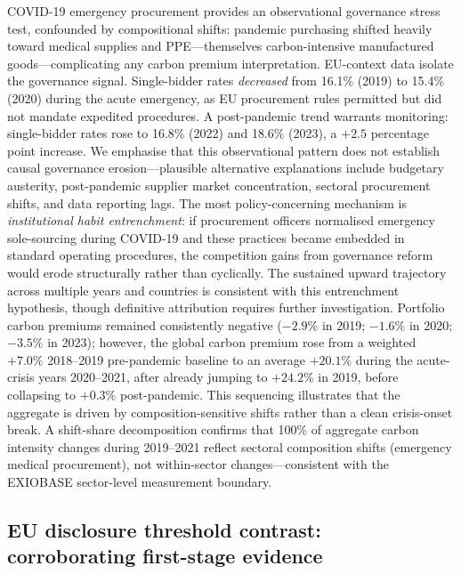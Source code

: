 \documentclass[11pt,a4paper]{article}
\begin{document}
COVID-19 emergency procurement provides an observational governance stress test, confounded by compositional shifts: pandemic purchasing shifted heavily toward medical supplies and PPE---themselves carbon-intensive manufactured goods---complicating any carbon premium interpretation. EU-context data isolate the governance signal. Single-bidder rates \textit{decreased} from 16.1\% (2019) to 15.4\% (2020) during the acute emergency, as EU procurement rules permitted but did not mandate expedited procedures\cite{eu2014directive}. A post-pandemic trend warrants monitoring: single-bidder rates rose to 16.8\% (2022) and 18.6\% (2023), a $+2.5$ percentage point increase. We emphasise that this observational pattern does not establish causal governance erosion---plausible alternative explanations include budgetary austerity, post-pandemic supplier market concentration, sectoral procurement shifts, and data reporting lags. The most policy-concerning mechanism is \textit{institutional habit entrenchment}: if procurement officers normalised emergency sole-sourcing during COVID-19 and these practices became embedded in standard operating procedures, the competition gains from governance reform would erode structurally rather than cyclically. The sustained upward trajectory across multiple years and countries is consistent with this entrenchment hypothesis, though definitive attribution requires further investigation. Portfolio carbon premiums remained consistently negative ($-2.9\%$ in 2019; $-1.6\%$ in 2020; $-3.5\%$ in 2023); however, the global carbon premium rose from a weighted $+7.0\%$ 2018--2019 pre-pandemic baseline to an average $+20.1\%$ during the acute-crisis years 2020--2021, after already jumping to $+24.2\%$ in 2019, before collapsing to $+0.3\%$ post-pandemic. This sequencing illustrates that the aggregate is driven by composition-sensitive shifts rather than a clean crisis-onset break. A shift-share decomposition confirms that 100\% of aggregate carbon intensity changes during 2019--2021 reflect sectoral composition shifts (emergency medical procurement), not within-sector changes---consistent with the EXIOBASE sector-level measurement boundary.

\subsection{EU disclosure threshold contrast: corroborating first-stage evidence}
\end{document}
